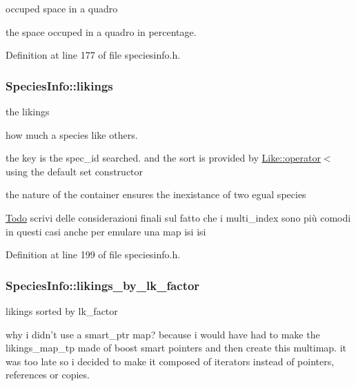 occuped space in a quadro 

the space occuped in a quadro in percentage. 

Definition at line 177 of file speciesinfo.h.

\hypertarget{structSpeciesInfo_a109b3e5acaf126bb8df9648b6c925542}{
\subsubsection[{likings}]{ {\bf SpeciesInfo::likings}}}
\label{structSpeciesInfo_a109b3e5acaf126bb8df9648b6c925542}


the likings 

how much a species like others.

the key is the spec\_\-id searched. and the sort is provided by \hyperlink{structLike_a0b36906c501104cbd13c0de9f02c2496}{Like::operator$<$} using the default set constructor

the nature of the container ensures the inexistance of two egual species

\begin{Desc}
\item[\hyperlink{todo__todo000002}{Todo}]scrivi delle considerazioni finali sul fatto che i multi\_\-index sono più comodi in questi casi anche per emulare una map isi isi \end{Desc}


Definition at line 199 of file speciesinfo.h.

\hypertarget{structSpeciesInfo_aa9502c5929b33379cefa95ec0f2ba7d7}{
\subsubsection[{likings\_\-by\_\-lk\_\-factor}]{ {\bf SpeciesInfo::likings\_\-by\_\-lk\_\-factor}}}
\label{structSpeciesInfo_aa9502c5929b33379cefa95ec0f2ba7d7}


likings sorted by lk\_\-factor 

why i didn't use a smart\_\-ptr map? because i would have had to make the likings\_\-map\_\-tp made of boost smart pointers and then create this multimap. it was too late so i decided to make it composed of iterators instead of pointers, references or copies.

